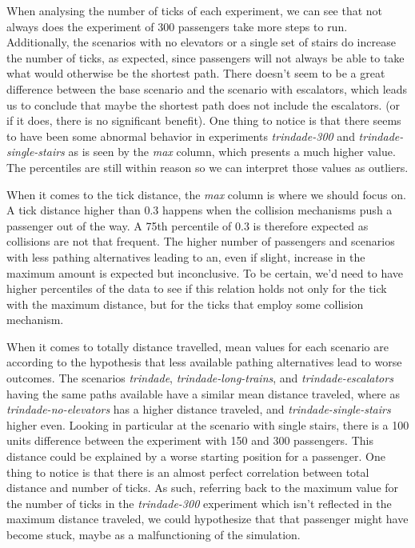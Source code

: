 When analysing the number of ticks of each experiment, we can see that not always does the experiment of 300 passengers take more steps to run. Additionally, the scenarios with no elevators or a single set of stairs do increase the number of ticks, as expected, since passengers will not always be able to take what would otherwise be the shortest path. There doesn't seem to be a great difference between the base scenario and the scenario with escalators, which leads us to conclude that maybe the shortest path does not include the escalators. (or if it does, there is no significant benefit). One thing to notice is that there seems to have been some abnormal behavior in experiments \textit{trindade-300} and \textit{trindade-single-stairs} as is seen by the \textit{max} column, which presents a much higher value. The percentiles are still within reason so we can interpret those values as outliers.

When it comes to the tick distance, the \textit{max} column is where we should focus on. A tick distance higher than 0.3 happens when the collision mechanisms push a passenger out of the way. A 75th percentile of 0.3 is therefore expected as collisions are not that frequent. The higher number of passengers and scenarios with less pathing alternatives leading to an, even if slight, increase in the maximum amount is expected but inconclusive. To be certain, we'd need to have higher percentiles of the data to see if this relation holds not only for the tick with the maximum distance, but for the ticks that employ some collision mechanism.

When it comes to totally distance travelled, mean values for each scenario are according to the hypothesis that less available pathing alternatives lead to worse outcomes. The scenarios \textit{trindade}, \textit{trindade-long-trains}, and \textit{trindade-escalators} having the same paths available have a similar mean distance traveled, where as \textit{trindade-no-elevators} has a higher distance traveled, and \textit{trindade-single-stairs} higher even. Looking in particular at the scenario with single stairs, there is a 100 units difference between the experiment with 150 and 300 passengers. This distance could be explained by a worse starting position for a passenger. One thing to notice is that there is an almost perfect correlation between total distance and number of ticks. As such, referring back to the maximum value for the number of ticks in the \textit{trindade-300} experiment which isn't reflected in the maximum distance traveled, we could hypothesize that that passenger might have become stuck, maybe as a malfunctioning of the simulation.

